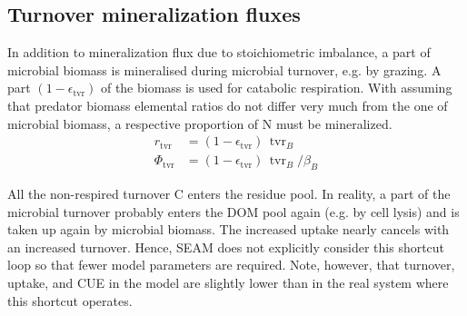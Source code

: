 \subsection{Turnover mineralization fluxes \label{sec:Tvr}}
In addition to mineralization flux due to stoichiometric imbalance, a part of
microbial biomass is mineralised during microbial turnover, e.g. by grazing. A
part $(1-\epsilon_{\operatorname{tvr}})$ of the biomass is used for catabolic
respiration. With assuming that predator biomass elemental ratios do not differ
very much from the one of microbial biomass, a respective proportion of N must
be mineralized.
\begin{subequations}
\label{eq:MinTvrB}
\begin{align} 
r_{\operatorname{tvr}} &= (1-\epsilon_{\operatorname{tvr}}) \,
\operatorname{tvr}_B
\\
\label{eq:PhiTvr}
\Phi_{\operatorname{tvr}} &=
(1-\epsilon_{\operatorname{tvr}}) \, \operatorname{tvr}_B / \beta_B
\end{align}
\end{subequations}

All the non-respired turnover C enters the residue pool. In reality, a part
of the microbial turnover probably enters the DOM pool again (e.g. by cell
lysis) and is taken up again by microbial biomass. The increased uptake nearly
cancels with an increased turnover. Hence, SEAM does not explicitly consider this
shortcut loop so that fewer model parameters are required.
Note, however, that turnover, uptake, and CUE in the model are
slightly lower than in the real system where this shortcut operates.


